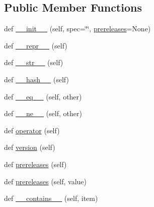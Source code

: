 \subsection*{Public Member Functions}
\begin{DoxyCompactItemize}
\item 
def \hyperlink{classsetuptools_1_1__vendor_1_1packaging_1_1specifiers_1_1__IndividualSpecifier_a25c110f9ca027a723ffd767b24894c0b}{\+\_\+\+\_\+init\+\_\+\+\_\+} (self, spec=\char`\"{}\char`\"{}, \hyperlink{classsetuptools_1_1__vendor_1_1packaging_1_1specifiers_1_1__IndividualSpecifier_a6d34f246410481ecb8ec832ff59c581e}{prereleases}=None)
\item 
def \hyperlink{classsetuptools_1_1__vendor_1_1packaging_1_1specifiers_1_1__IndividualSpecifier_a5bdf2d4a602c6ab875689c948fbe0633}{\+\_\+\+\_\+repr\+\_\+\+\_\+} (self)
\item 
def \hyperlink{classsetuptools_1_1__vendor_1_1packaging_1_1specifiers_1_1__IndividualSpecifier_acc6ad408813f79ff000ae86244490ac2}{\+\_\+\+\_\+str\+\_\+\+\_\+} (self)
\item 
def \hyperlink{classsetuptools_1_1__vendor_1_1packaging_1_1specifiers_1_1__IndividualSpecifier_af55d4a0d02c4f5a760a366b9a0d2cfbd}{\+\_\+\+\_\+hash\+\_\+\+\_\+} (self)
\item 
def \hyperlink{classsetuptools_1_1__vendor_1_1packaging_1_1specifiers_1_1__IndividualSpecifier_a49d204d8231219298f2ab7fdd912cee9}{\+\_\+\+\_\+eq\+\_\+\+\_\+} (self, other)
\item 
def \hyperlink{classsetuptools_1_1__vendor_1_1packaging_1_1specifiers_1_1__IndividualSpecifier_a9a86dbe94403e797c29305351c48aafb}{\+\_\+\+\_\+ne\+\_\+\+\_\+} (self, other)
\item 
def \hyperlink{classsetuptools_1_1__vendor_1_1packaging_1_1specifiers_1_1__IndividualSpecifier_a83c97848909ecb7225cc89796fc3e0bf}{operator} (self)
\item 
def \hyperlink{classsetuptools_1_1__vendor_1_1packaging_1_1specifiers_1_1__IndividualSpecifier_adbeb1ca50221bae20afba44631b69ea1}{version} (self)
\item 
def \hyperlink{classsetuptools_1_1__vendor_1_1packaging_1_1specifiers_1_1__IndividualSpecifier_a6d34f246410481ecb8ec832ff59c581e}{prereleases} (self)
\item 
def \hyperlink{classsetuptools_1_1__vendor_1_1packaging_1_1specifiers_1_1__IndividualSpecifier_adb887c73a585371527ef26bdf29dbefe}{prereleases} (self, value)
\item 
def \hyperlink{classsetuptools_1_1__vendor_1_1packaging_1_1specifiers_1_1__IndividualSpecifier_ac8c5634a825694d276f2cf5c4b3cb9bd}{\+\_\+\+\_\+contains\+\_\+\+\_\+} (self, item)

\end{DoxyCompactItemize}
